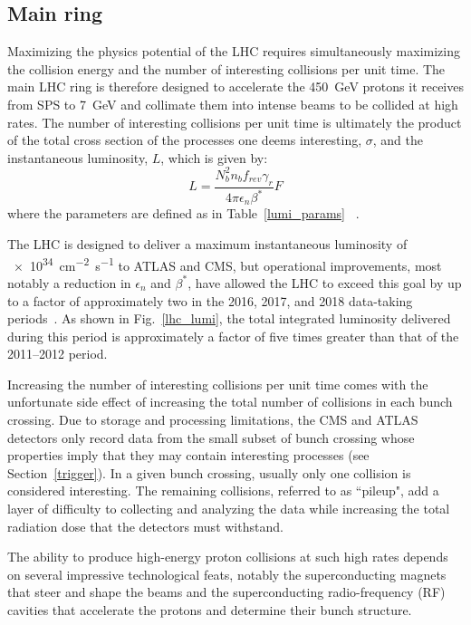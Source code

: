

\subsection{Main ring}
Maximizing the physics potential of the LHC requires simultaneously maximizing the collision energy and the number of interesting collisions per unit time. The main LHC ring is therefore designed to accelerate the \SI{450}{\GeV} protons it receives from SPS to \SI{7}{\GeV} and collimate them into intense beams to be collided at high rates. The number of interesting collisions per unit time is ultimately the product of the total cross section of the processes one deems interesting, $\sigma$, and the instantaneous luminosity, $L$, which is given by:
\begin{equation}
\label{lumi_eq}
L = \frac{N_{b}^{2} n_{b} f_{rev} \gamma_{r}}{4 \pi \epsilon_{n} \beta^{*}}F
\end{equation}
where the parameters are defined as in Table~\ref{lumi_params} ~\cite{lhc_machine}.



The LHC is designed to deliver a maximum instantaneous luminosity of \linebreak[4] \SI{e34}{\cm\tothe{-2}\s\tothe{-1}} to ATLAS and CMS, but operational improvements, most notably a reduction in $\epsilon_{n}$ and $\beta^{*}$, have allowed the LHC to exceed this goal by up to a factor of approximately two in the 2016, 2017, and 2018 data-taking periods~\cite{lhc_run2_operation}. As shown in Fig.~\ref{lhc_lumi}, the total integrated luminosity delivered during this period is approximately a factor of five times greater than that of the 2011--2012 period.

Increasing the number of interesting collisions per unit time comes with the unfortunate side effect of increasing the total number of collisions in each bunch crossing. Due to storage and processing limitations, the CMS and ATLAS detectors only record data from the small subset of bunch crossing whose properties imply that they may contain interesting processes (see Section~\ref{trigger}). In a given bunch crossing, usually only one collision is considered interesting. The remaining collisions, referred to as ``pileup", add a layer of difficulty to collecting and analyzing the data while increasing the total radiation dose that the detectors must withstand.

The ability to produce high-energy proton collisions at such high rates depends on several impressive technological feats, notably the superconducting magnets that steer and shape the beams and the superconducting radio-frequency (RF) cavities that accelerate the protons and determine their bunch structure.

